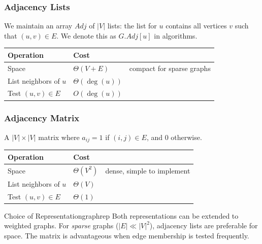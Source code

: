 \subsubsection{Adjacency Lists}

We maintain an array $\mathit{Adj}$ of $|V|$ lists: the list for $u$ contains
all vertices $v$ such that $(u, v) \in E$. We denote this as $G.\mathit{Adj}[u]$ in
algorithms.

\begin{center}
\renewcommand{\arraystretch}{1.25}
\begin{tabular}{lll}
\toprule
\textbf{Operation} & \textbf{Cost} & \\
\midrule
Space & $\Theta(V + E)$ & compact for sparse graphs \\
List neighbors of $u$ & $\Theta(\deg(u))$ & \\
Test $(u,v) \in E$ & $O(\deg(u))$ & \\
\bottomrule
\end{tabular}
\end{center}

\subsubsection{Adjacency Matrix}

A $|V| \times |V|$ matrix where $a_{ij} = 1$ if $(i,j) \in E$, and 0 otherwise.

\begin{center}
\renewcommand{\arraystretch}{1.25}
\begin{tabular}{lll}
\toprule
\textbf{Operation} & \textbf{Cost} & \\
\midrule
Space & $\Theta(V^2)$ & dense, simple to implement \\
List neighbors of $u$ & $\Theta(V)$ & \\
Test $(u,v) \in E$ & $\Theta(1)$ & \\
\bottomrule
\end{tabular}
\end{center}

\begin{remark}{Choice of Representation}{graphrep}
Both representations can be extended to weighted graphs.
For \emph{sparse} graphs ($|E| \ll |V|^2$), adjacency lists are
preferable for space. The matrix is advantageous when edge membership
is tested frequently.
\end{remark}

